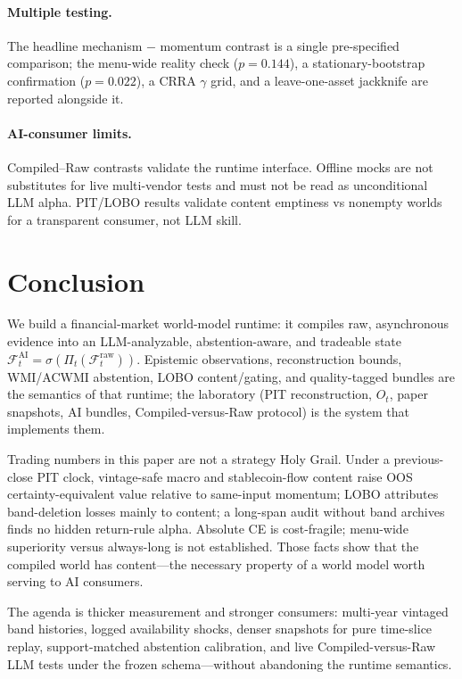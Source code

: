 \documentclass[12pt]{article}
\begin{document}
\paragraph{Multiple testing.}
The headline mechanism $-$ momentum contrast is a single pre-specified comparison; the menu-wide reality check ($p=0.144$), a stationary-bootstrap confirmation ($p=0.022$), a CRRA $\gamma$ grid, and a leave-one-asset jackknife are reported alongside it.

\paragraph{AI-consumer limits.}
Compiled--Raw contrasts validate the runtime interface. Offline mocks are not substitutes for live multi-vendor tests and must not be read as unconditional LLM alpha. PIT/LOBO results validate content emptiness vs nonempty worlds for a transparent consumer, not LLM skill.

\section{Conclusion}
\label{sec:conc}

We build a financial-market world-model runtime: it compiles raw, asynchronous evidence into an LLM-analyzable, abstention-aware, and tradeable state $\mathcal{F}^{\mathrm{AI}}_t=\sigma(\Pi_t(\mathcal{F}^{\mathrm{raw}}_t))$. Epistemic observations, reconstruction bounds, WMI/ACWMI abstention, LOBO content/gating, and quality-tagged bundles are the semantics of that runtime; the laboratory (PIT reconstruction, $O_t$, paper snapshots, AI bundles, Compiled-versus-Raw protocol) is the system that implements them.

Trading numbers in this paper are not a strategy Holy Grail. Under a previous-close PIT clock, vintage-safe macro and stablecoin-flow content raise OOS certainty-equivalent value relative to same-input momentum; LOBO attributes band-deletion losses mainly to content; a long-span audit without band archives finds no hidden return-rule alpha. Absolute CE is cost-fragile; menu-wide superiority versus always-long is not established. Those facts show that the compiled world has content---the necessary property of a world model worth serving to AI consumers.

The agenda is thicker measurement and stronger consumers: multi-year vintaged band histories, logged availability shocks, denser snapshots for pure time-slice replay, support-matched abstention calibration, and live Compiled-versus-Raw LLM tests under the frozen schema---without abandoning the runtime semantics.
\end{document}
